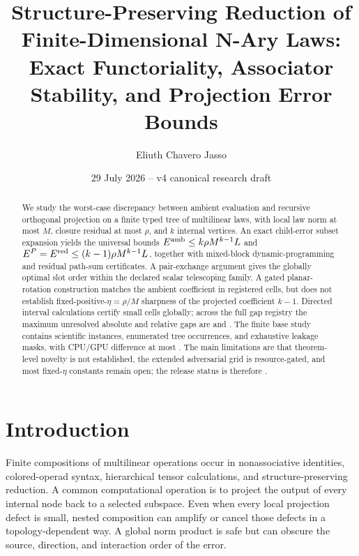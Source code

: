 \documentclass[11pt]{amsart}
\title[Structure-preserving reduction of finite-dimensional N-ary laws]{Structure-Preserving Reduction of Finite-Dimensional N-Ary Laws: Exact Functoriality, Associator Stability, and Projection Error Bounds}
\author{Eliuth Chavero Jasso}
\date{29 July 2026 -- v4 canonical research draft}
\theoremstyle{definition}
\theoremstyle{remark}
\begin{document}
\begin{abstract}
We study the worst-case discrepancy between ambient evaluation and recursive orthogonal projection on a finite typed tree of multilinear laws, with local law norm at most \(M\), closure residual at most \(\rho\), and \(k\) internal vertices.  An exact child-error subset expansion yields the universal bounds \(E^{\rm amb}\le k\rho M^{k-1}L\) and \(E^P=E^{\rm red}\le(k-1)\rho M^{k-1}L\), together with mixed-block dynamic-programming and residual path-sum certificates.  A pair-exchange argument gives the globally optimal slot order within the declared scalar telescoping family.  A gated planar-rotation construction matches the ambient coefficient in registered cells, but does not establish fixed-positive-\(\eta=\rho/M\) sharpness of the projected coefficient \(k-1\).  Directed interval calculations certify \VThreeExactCells{} small cells globally; across the full gap registry the maximum unresolved absolute and relative gaps are \VThreeMaxAbsoluteGap{} and \VThreeMaxRelativeGap{}.  The finite base study contains \VThreeScientificInstances{} scientific instances, \VThreeTreeOccurrences{} enumerated tree occurrences, and \VThreeLeakageMasks{} exhaustive leakage masks, with CPU/GPU difference at most \VThreeMaxParity{}.  The main limitations are that theorem-level novelty is not established, the extended adversarial grid is resource-gated, and most fixed-\(\eta\) constants remain open; the release status is therefore \VThreeReleaseStatus{}.
\end{abstract}

\maketitle

\section{Introduction}

Finite compositions of multilinear operations occur in nonassociative
identities, colored-operad syntax, hierarchical tensor calculations, and
structure-preserving reduction.  A common computational operation is to
project the output of every internal node back to a selected subspace.  Even
when every local projection defect is small, nested composition can amplify
or cancel those defects in a topology-dependent way.  A global norm product
is safe but can obscure the source, direction, and interaction order of the
error.
\end{document}
